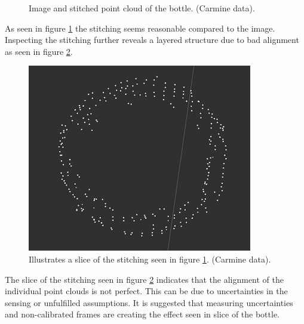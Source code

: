 \begin{figure}[htb]
\begin{subfigure}[b]{0.4\textwidth}
\begin{center}
			\end{center}
        \end{subfigure}  
		\caption{Image and stitched point cloud of the bottle. (Carmine data).}\label{fig:bottle}
\end{figure}

\noindent As seen in figure \ref{fig:bottle} the stitching seems reasonable compared to the image. Inspecting the stitching further reveals a layered structure due to bad alignment as seen in figure \ref{fig:bottle_slice}.

\begin{figure}[htb]
	\begin{center}
		\includegraphics[scale=0.7,trim=0 0 0 0]{graphics/07_modelling/slice.png}%
		\caption{Illustrates a slice of the stitching seen in figure \ref{fig:bottle}. (Carmine data).}
		\label{fig:bottle_slice}
	\end{center}
\end{figure}

\noindent The slice of the stitching seen in figure \ref{fig:bottle_slice} indicates that the alignment of the individual point clouds is not perfect. This can be due to uncertainties in the sensing or unfulfilled assumptions. It is suggested that measuring uncertainties and non-calibrated frames are creating the effect seen in slice of the bottle.\\